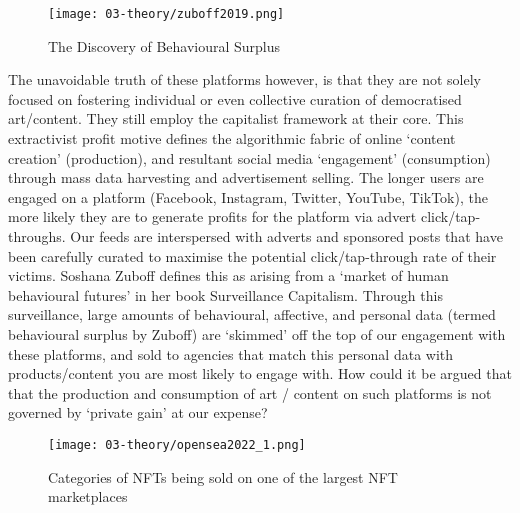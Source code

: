\begin{figure}[ht]
    \centering
    \texttt{[image: 03-theory/zuboff2019.png]}
    \captionsetup{justification=centering,margin=1.5cm}
    \caption{The Discovery of Behavioural Surplus \citep[in][]{zuboff2019}}\label{fig: zuboff2019}
\end{figure}

The unavoidable truth of these platforms however, is that they are not solely focused on fostering individual or even collective curation of democratised art/content. They still employ the capitalist framework at their core. This extractivist profit motive defines the algorithmic fabric of online `content creation' (production), and resultant social media `engagement' (consumption) through mass data harvesting and advertisement selling. The longer users are engaged on a platform (Facebook, Instagram, Twitter, YouTube, TikTok), the more likely they are to generate profits for the platform via advert click/tap-throughs. Our feeds are interspersed with adverts and sponsored posts that have been carefully curated to maximise the potential click/tap-through rate of their victims. Soshana Zuboff defines this as arising from a `market of human behavioural futures' \citeyearpar{zuboff2019} in her book Surveillance Capitalism. Through this surveillance, large amounts of behavioural, affective, and personal data (termed behavioural surplus by Zuboff) are `skimmed' off the top of our engagement with these platforms, and sold to agencies that match this personal data with products/content you are most likely to engage with. How could it be argued that that the production and consumption of art / content on such platforms is not governed by `private gain' at our expense? 

\begin{figure}[ht]
    \centering
    \texttt{[image: 03-theory/opensea2022\_1.png]}
    \captionsetup{justification=centering,margin=1.5cm}
    \caption{Categories of NFTs being sold on one of the largest NFT marketplaces \citep[from][]{opensea2022a}}\label{fig: opensea2022_1}
\end{figure}


